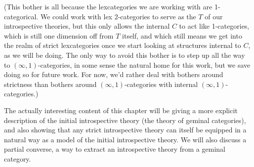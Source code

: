 (This bother is all because the lexcategories we are working with are 1-categorical. We could work with lex 2-categories to serve as the $T$ of our introspective theories, but this only allows the internal $C$ to act like 1-categories, which is still one dimension off from $T$ itself, and which still means we get into the realm of strict lexcategories once we start looking at structures internal to $C$, as we will be doing. The only way to avoid this bother is to step up all the way to $(\infty, 1)$-categories, in some sense the natural home for this work, but we save doing so for future work. For now, we'd rather deal with bothers around strictness than bothers around $(\infty, 1)$-categories with internal $(\infty, 1)$-categories.)

The actually interesting content of this chapter will be giving a more explicit description of the initial introspective theory (the theory of geminal categories), and also showing that any strict introspective theory can itself be equipped in a natural way as a model of the initial introspective theory. We will also discuss a partial converse, a way to extract an introspective theory from a geminal category.


